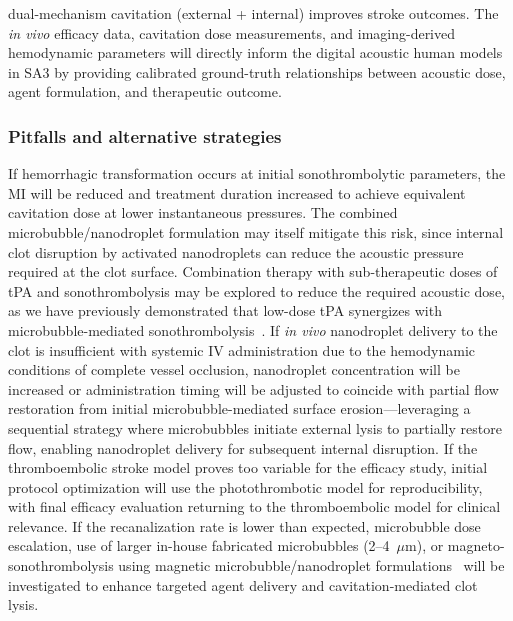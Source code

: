 dual-mechanism cavitation (external + internal) improves stroke outcomes. The \textit{in vivo} efficacy data, cavitation dose measurements, and imaging-derived hemodynamic parameters will directly inform the digital acoustic human models in SA3 by providing calibrated ground-truth relationships between acoustic dose, agent formulation, and therapeutic outcome.

\subsubsection{Pitfalls and alternative strategies}
If hemorrhagic transformation occurs at initial sonothrombolytic parameters, the MI will be reduced and treatment duration increased to achieve equivalent cavitation dose at lower instantaneous pressures. The combined microbubble/nanodroplet formulation may itself mitigate this risk, since internal clot disruption by activated nanodroplets can reduce the acoustic pressure required at the clot surface. Combination therapy with sub-therapeutic doses of tPA and sonothrombolysis may be explored to reduce the required acoustic dose, as we have previously demonstrated that low-dose tPA synergizes with microbubble-mediated sonothrombolysis~\cite{goel2020examining}. If \textit{in vivo} nanodroplet delivery to the clot is insufficient with systemic IV administration due to the hemodynamic conditions of complete vessel occlusion, nanodroplet concentration will be increased or administration timing will be adjusted to coincide with partial flow restoration from initial microbubble-mediated surface erosion---leveraging a sequential strategy where microbubbles initiate external lysis to partially restore flow, enabling nanodroplet delivery for subsequent internal disruption. If the thromboembolic stroke model proves too variable for the efficacy study, initial protocol optimization will use the photothrombotic model for reproducibility, with final efficacy evaluation returning to the thromboembolic model for clinical relevance. If the recanalization rate is lower than expected, microbubble dose escalation, use of larger in-house fabricated microbubbles (2--4~$\mu$m), or magneto-sonothrombolysis using magnetic microbubble/nanodroplet formulations~\cite{zhang2021magneto} will be investigated to enhance targeted agent delivery and cavitation-mediated clot lysis.

